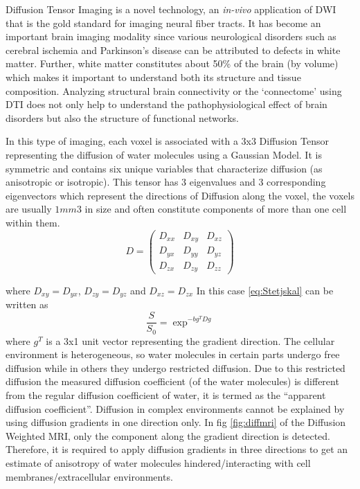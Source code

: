 \documentclass[msthesis.tex]{subfiles}
\begin{document}
Diffusion Tensor Imaging is a novel technology, an \textit{in-vivo } application of DWI that is the gold standard for imaging neural fiber tracts. It has become an important brain imaging modality since various neurological disorders such as cerebral ischemia and Parkinson’s disease can be attributed to defects in white matter. Further, white matter constitutes about 50\% of the brain (by volume) which makes it important to understand both its structure and tissue composition. Analyzing structural brain connectivity or the ‘connectome’ using DTI does not only help to understand the pathophysiological effect of brain disorders but also the structure of functional networks.

In this type of imaging, each voxel is associated with a 3x3 Diffusion Tensor representing the diffusion of water molecules using a Gaussian Model. It is symmetric and contains six unique variables that characterize diffusion (as anisotropic or isotropic). This tensor has 3 eigenvalues and 3 corresponding eigenvectors which represent the directions of Diffusion along the voxel, the voxels are usually $1 mm3$ in size and often constitute components of more than one cell within them.
\begin{equation*}
D =
\begin{pmatrix}
D_{xx} & D_{xy} & D_{xz} \\
D_{yx} & D_{yy} & D_{yz} \\
D_{zx} & D_{zy} & D_{zz}
\end{pmatrix}  
\end{equation*}

where $D_{xy} = D_{yx}$, $D_{zy}=D_{yz}$ and $D_{xz}=D_{zx}$
In this case \autoref{eq:Stetjskal} can be written as 
\begin{equation}
\frac{S}{S_0} =  \exp^{-bg^T Dg}
\end{equation}where $g^T$ is a 3x1 unit vector representing the gradient direction.
The cellular environment is heterogeneous, so water molecules in certain parts undergo free diffusion while in others they undergo restricted diffusion. Due to this restricted diffusion the measured diffusion coefficient (of the water molecules) is different from the regular diffusion coefficient of water, it is termed as the “apparent diffusion coefficient”. Diffusion in complex environments cannot be explained by using diffusion gradients in one direction only. In fig \autoref{fig:diffmri} of the Diffusion Weighted MRI, only the component along the gradient direction is detected. Therefore, it is required to apply diffusion gradients in three directions to get an estimate of anisotropy of water molecules hindered/interacting with cell membranes/extracellular environments. 
\end{document}
